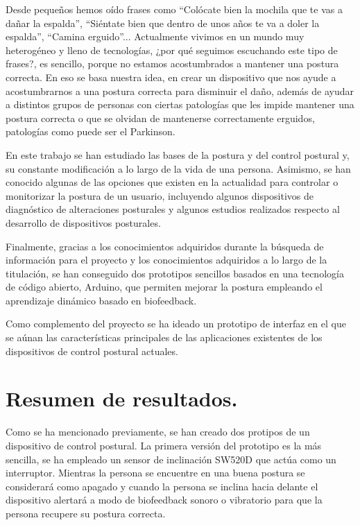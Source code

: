 
Desde pequeños hemos oído frases como ``Colócate bien la mochila que te vas a dañar la espalda'', ``Siéntate bien que dentro de unos años te va a doler la espalda'', ``Camina erguido''... Actualmente vivimos en un mundo muy heterogéneo y lleno de tecnologías, ¿por qué seguimos escuchando este tipo de frases?, es sencillo, porque no estamos acostumbrados a mantener una postura correcta. En eso se basa nuestra idea, en crear un dispositivo que nos ayude a acostumbrarnos a una postura correcta para disminuir el daño, además de ayudar a distintos grupos de personas con ciertas patologías que les impide mantener una postura correcta o que se olvidan de mantenerse correctamente erguidos, patologías como puede ser el Parkinson. 

En este trabajo se han estudiado las bases de la postura y del control postural y, su constante modificación a lo largo de la vida de una persona. Asimismo, se han conocido algunas de las opciones que existen en la actualidad para controlar o monitorizar la postura de un usuario, incluyendo algunos dispositivos de diagnóstico de alteraciones posturales y algunos estudios realizados respecto al desarrollo de dispositivos posturales.

Finalmente, gracias a los conocimientos adquiridos durante la búsqueda de información para el proyecto y los conocimientos adquiridos a lo largo de la titulación, se han conseguido dos prototipos sencillos basados en una tecnología de código abierto, Arduino, que permiten mejorar la postura empleando el aprendizaje dinámico basado en biofeedback. 

Como complemento del proyecto se ha ideado un prototipo de interfaz en el que se aúnan las características principales de las aplicaciones existentes de los dispositivos de control postural actuales.


\section{Resumen de resultados.}

Como se ha mencionado previamente, se han creado dos protipos de un dispositivo de control postural. La primera versión del prototipo es la más sencilla, se ha empleado un sensor de inclinación SW520D que actúa como un interruptor. Mientras la persona se encuentre en una buena postura se considerará como apagado y cuando la persona se inclina hacia delante el dispositivo alertará a modo de biofeedback sonoro o vibratorio para que la persona recupere su postura correcta. 

